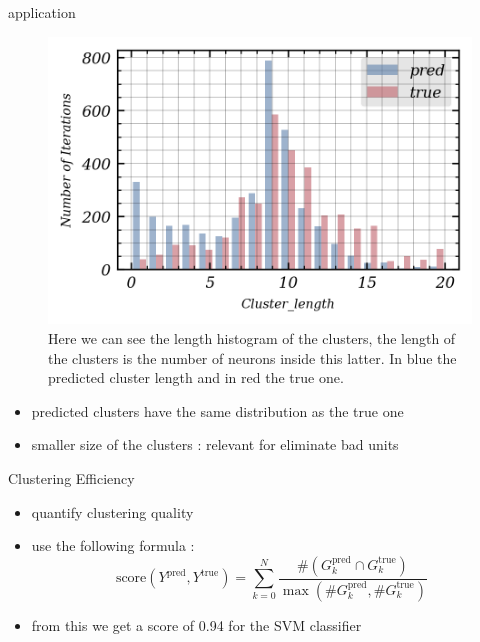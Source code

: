 \documentclass[numbering=fraction]{beamer}
\begin{document}
\begin{frame}{application}
    \begin{figure}[H]
        \includegraphics[width = .6\linewidth]{./figure/cluster_length.png}
        \caption{\scriptsize{Here we can see the length histogram of the clusters, the length of the clusters is the number of neurons inside this latter. In blue the predicted cluster length and in red the true one.}}
    \end{figure}
    \begin{itemize}
        \item predicted clusters have the same distribution as the true one
        \item smaller size of the clusters : relevant for eliminate bad units
    \end{itemize}
\end{frame}
\begin{frame}{Clustering Efficiency}

    \begin{itemize}
        \item quantify clustering quality
        \item use the following formula :     $$ \text{score}(Y^{\text{pred}}, Y^{\text{true}}) = \sum_{k=0}^N \frac{ \# (G_k^{\text{pred}} \cap  G_k^{\text{true}})}{\max (\# G_k^{\text{pred}}, \# G_k^{\text{true}})}$$
        \item from this we get a score of 0.94 for the SVM classifier
    \end{itemize}
\end{frame}
\end{document}
